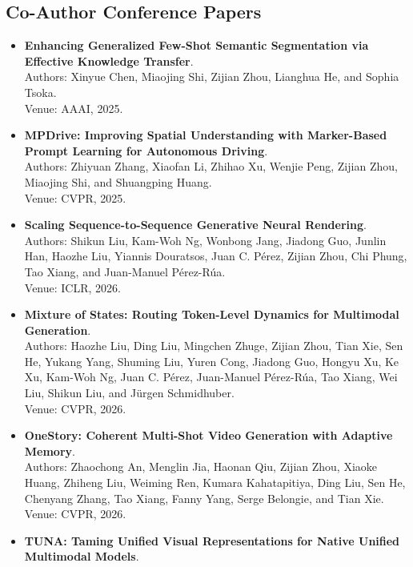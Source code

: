 \subsection{Co-Author Conference Papers}
\begin{itemize}
    \item \textbf{Enhancing Generalized Few-Shot Semantic Segmentation via Effective Knowledge Transfer}.\\
    Authors: Xinyue Chen, Miaojing Shi, Zijian Zhou, Lianghua He, and Sophia Tsoka.\\
    Venue: AAAI, 2025.~\citep{chen2025enhancing}
    \item \textbf{MPDrive: Improving Spatial Understanding with Marker-Based Prompt Learning for Autonomous Driving}.\\
    Authors: Zhiyuan Zhang, Xiaofan Li, Zhihao Xu, Wenjie Peng, Zijian Zhou, Miaojing Shi, and Shuangping Huang.\\
    Venue: CVPR, 2025.~\citep{zhang2025mpdrive}
    \item \textbf{Scaling Sequence-to-Sequence Generative Neural Rendering}.\\
    Authors: Shikun Liu, Kam-Woh Ng, Wonbong Jang, Jiadong Guo, Junlin Han, Haozhe Liu, Yiannis Douratsos, Juan C. Pérez, Zijian Zhou, Chi Phung, Tao Xiang, and Juan-Manuel Pérez-Rúa.\\
    Venue: ICLR, 2026.~\citep{liu2025scaling}
    \item \textbf{Mixture of States: Routing Token-Level Dynamics for Multimodal Generation}.\\
    Authors: Haozhe Liu, Ding Liu, Mingchen Zhuge, Zijian Zhou, Tian Xie, Sen He, Yukang Yang, Shuming Liu, Yuren Cong, Jiadong Guo, Hongyu Xu, Ke Xu, Kam-Woh Ng, Juan C. Pérez, Juan-Manuel Pérez-Rúa, Tao Xiang, Wei Liu, Shikun Liu, and Jürgen Schmidhuber.\\
    Venue: CVPR, 2026.~\citep{liu2025mixture}
    \item \textbf{OneStory: Coherent Multi-Shot Video Generation with Adaptive Memory}.\\
    Authors: Zhaochong An, Menglin Jia, Haonan Qiu, Zijian Zhou, Xiaoke Huang, Zhiheng Liu, Weiming Ren, Kumara Kahatapitiya, Ding Liu, Sen He, Chenyang Zhang, Tao Xiang, Fanny Yang, Serge Belongie, and Tian Xie.\\
    Venue: CVPR, 2026.~\citep{an2025onestory}
    \item \textbf{TUNA: Taming Unified Visual Representations for Native Unified Multimodal Models}.\\

\end{itemize}
